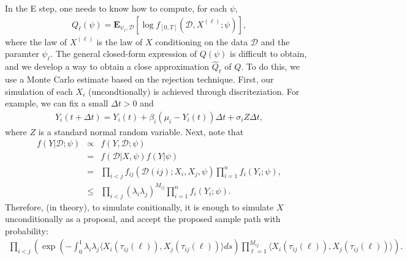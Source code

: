 \documentclass[12pt]{article}%
\begin{document}
In the E step, one needs to know how to compute, for each $\psi$,
\begin{eqnarray}
Q_\ell(\psi) = \mathbf E_{\psi_\ell,\mathcal D}\left[ \log f_{[0,T]}(\mathcal D, X^{(\ell)};\psi)\right],
\end{eqnarray}
where the law of $X^{(\ell)}$ is the law of $X$ conditioning on the data $\mathcal D$ and the paramter $\psi_\ell$.  
The general closed-form expression of $Q(\psi)$ is difficult to obtain, 
and we develop a way to obtain a close approximation $\widehat{Q}_\ell$ of $Q$.  
To do this, we use a Monte Carlo estimate based on the rejection technique. 
 First, our simulation of each $X_i$ (uncondtionally) is achieved through discriteziation.  
For example, we can fix a small $\Delta t > 0$ and 
\begin{eqnarray}
Y_i(t+\Delta t) = Y_i(t) + \beta_i(\mu_i - Y_i(t)) \Delta t + \sigma_i  Z \Delta t,
\end{eqnarray}
where $Z$ is a standard normal random variable.  
Next, note that 
\begin{eqnarray}
f(Y\left|\mathcal D\right.;\psi) 
&\propto& f(Y,\mathcal D;\psi) \\
&=& f(\mathcal D\left|X,\psi\right.) f(Y\left|\psi\right.)\\
&=& \prod_{i<j} f_{ij}(\mathcal D(ij);X_i,X_j,\psi) \prod_{i=1}^n f_{i}(Y_i;\psi),\\
&\le & \prod_{i<j} (\lambda_i \lambda_j)^{M_{ij}} \prod_{i=1}^n f_{i}(Y_i;\psi).
\end{eqnarray}
Therefore, (in theory), to simulate conitionally, it is enough to simulate 
$X$ unconditionally as a proposal, and accept the proposed sample path
with probability:
\begin{eqnarray}
\prod_{i<j} \left(
\exp\left(-\int_{0}^{1} \lambda_i \lambda_j \langle X_i(\tau_{ij}(\ell)),X_j(\tau_{ij}(\ell))\rangle ds\right)
\prod_{\ell=1}^{M_{ij}}\langle X_i(\tau_{ij}(\ell)),X_j(\tau_{ij}(\ell))\rangle\right)
. 
\end{eqnarray}
\end{document}
